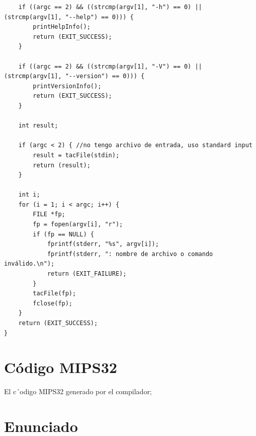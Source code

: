 \documentclass[a4paper,11pt]{article}
\begin{document}
\begin{lstlisting}
    if ((argc == 2) && ((strcmp(argv[1], "-h") == 0) || (strcmp(argv[1], "--help") == 0))) {
        printHelpInfo();
        return (EXIT_SUCCESS);
    }

    if ((argc == 2) && ((strcmp(argv[1], "-V") == 0) || (strcmp(argv[1], "--version") == 0))) {
        printVersionInfo();
        return (EXIT_SUCCESS);
    }

    int result;

    if (argc < 2) { //no tengo archivo de entrada, uso standard input
        result = tacFile(stdin);
        return (result);
    }

    int i;
    for (i = 1; i < argc; i++) {
        FILE *fp;
        fp = fopen(argv[i], "r");
        if (fp == NULL) {
            fprintf(stderr, "%s", argv[i]);
            fprintf(stderr, ": nombre de archivo o comando inválido.\n");
            return (EXIT_FAILURE);
        }
        tacFile(fp);
        fclose(fp);
    }
    return (EXIT_SUCCESS);
}

\end{lstlisting}

\section{C\'odigo MIPS32}
El c´odigo MIPS32 generado por el compilador;

\section{Enunciado}

\maketitle
\end{document}
